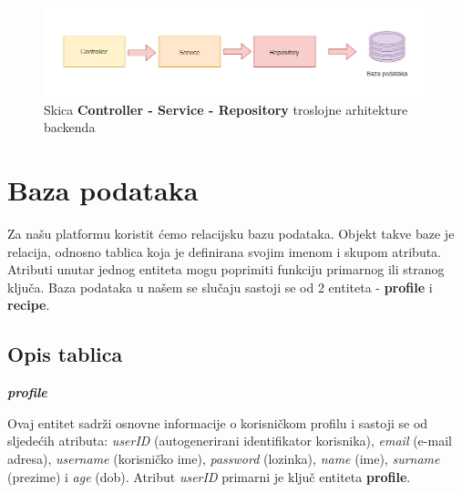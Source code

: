 \bigskip
   
   			\begin{figure}[H]
			    \centering
			    \includegraphics[width=1\linewidth]{slike/csr_arh.png}
			    \caption{Skica \textbf{Controller - Service - Repository} troslojne arhitekture backenda}
			    \label{fig:enter-label}
			\end{figure}

   \eject

		\section{Baza podataka}
			
		Za našu platformu koristit ćemo relacijsku bazu podataka. Objekt takve baze je relacija, odnosno tablica koja je definirana svojim imenom i skupom atributa. Atributi unutar jednog entiteta mogu poprimiti funkciju primarnog ili stranog ključa.
Baza podataka u našem se slučaju sastoji se od 2 entiteta - \textbf{profile} i \textbf{recipe}.
		
			\subsection{Opis tablica}

\noindent \textbf{\textit{profile}}\\
\begin{samepage}
Ovaj entitet sadrži osnovne informacije o korisničkom profilu i  sastoji se od sljedećih atributa: \textit{userID} (autogenerirani identifikator korisnika), \textit{email }(e-mail adresa), \textit{username} (korisničko ime), \textit{password} (lozinka), \textit{name} (ime), \textit{surname} (prezime) i \textit{age} (dob). Atribut\textit{ userID} primarni je ključ entiteta \textbf{profile}. 
\end{samepage}

